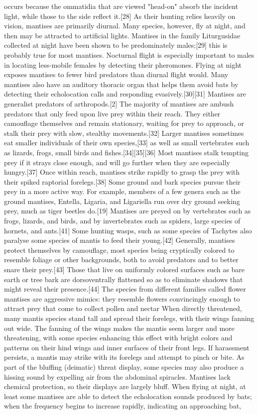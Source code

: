 \documentclass[twoside, 12pt, letterpaper]{report}\usepackage[]{graphicx}\usepackage[]{color}
\begin{document}
\begin{multicols*}{2}
occurs because the ommatidia that are viewed "head-on" absorb the incident light, while those to the side reflect it.[28] As their hunting relies heavily on vision, mantises are primarily diurnal. Many species, however, fly at night, and then may be attracted to artificial lights. Mantises in the family Liturgusidae collected at night have been shown to be predominately males;[29] this is probably true for most mantises. Nocturnal flight is especially important to males in locating less-mobile females by detecting their pheromones. Flying at night exposes mantises to fewer bird predators than diurnal flight would. Many mantises also have an auditory thoracic organ that helps them avoid bats by detecting their echolocation calls and responding evasively.[30][31] Mantises are generalist predators of arthropods.[2] The majority of mantises are ambush predators that only feed upon live prey within their reach. They either camouflage themselves and remain stationary, waiting for prey to approach, or stalk their prey with slow, stealthy movements.[32] Larger mantises sometimes eat smaller individuals of their own species,[33] as well as small vertebrates such as lizards, frogs, small birds and fishes.[34][35][36] Most mantises stalk tempting prey if it strays close enough, and will go further when they are especially hungry.[37] Once within reach, mantises strike rapidly to grasp the prey with their spiked raptorial forelegs.[38] Some ground and bark species pursue their prey in a more active way. For example, members of a few genera such as the ground mantises, Entella, Ligaria, and Ligariella run over dry ground seeking prey, much as tiger beetles do.[19] Mantises are preyed on by vertebrates such as frogs, lizards, and birds, and by invertebrates such as spiders, large species of hornets, and ants.[41] Some hunting wasps, such as some species of Tachytes also paralyse some species of mantis to feed their young.[42] Generally, mantises protect themselves by camouflage, most species being cryptically colored to resemble foliage or other backgrounds, both to avoid predators and to better snare their prey.[43] Those that live on uniformly colored surfaces such as bare earth or tree bark are dorsoventrally flattened so as to eliminate shadows that might reveal their presence.[44] The species from different families called flower mantises are aggressive mimics: they resemble flowers convincingly enough to attract prey that come to collect pollen and nectar When directly threatened, many mantis species stand tall and spread their forelegs, with their wings fanning out wide. The fanning of the wings makes the mantis seem larger and more threatening, with some species enhancing this effect with bright colors and patterns on their hind wings and inner surfaces of their front legs. If harassment persists, a mantis may strike with its forelegs and attempt to pinch or bite. As part of the bluffing (deimatic) threat display, some species may also produce a hissing sound by expelling air from the abdominal spiracles. Mantises lack chemical protection, so their displays are largely bluff. When flying at night, at least some mantises are able to detect the echolocation sounds produced by bats; when the frequency begins to increase rapidly, indicating an approaching bat, 
\end{multicols*}
\end{document}
